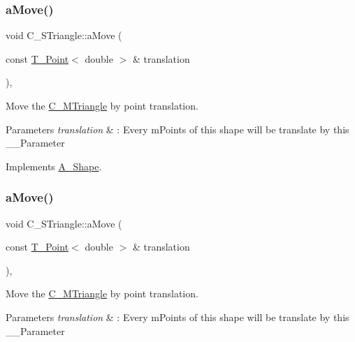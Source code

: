 \subsubsection{\texorpdfstring{a\+Move()}{aMove()}\hspace{0.1cm}{\footnotesize\ttfamily [1/2]}}
{\footnotesize\ttfamily void C\+\_\+\+S\+Triangle\+::a\+Move (\begin{DoxyParamCaption}\item[{const \hyperlink{classT__Point}{T\+\_\+\+Point}$<$ double $>$ \&}]{translation }\end{DoxyParamCaption})\hspace{0.3cm}{\ttfamily [override]}, {\ttfamily [virtual]}}



Move the \hyperlink{classC__MTriangle}{C\+\_\+\+M\+Triangle} by point translation. 


\begin{DoxyParams}{Parameters}
{\em translation} & \+: Every m\+Points of this shape will be translate by this \+\_\+\+\_\+\+Parameter \\
\hline
\end{DoxyParams}


Implements \hyperlink{classA__Shape_ab284298db1b557ccfa7ba6de7a5fee2c}{A\+\_\+\+Shape}.

\mbox{\label{classC__STriangle_a82a3c3a847ca6c2d5922921150fa50b5}} 
\subsubsection{\texorpdfstring{a\+Move()}{aMove()}\hspace{0.1cm}{\footnotesize\ttfamily [2/2]}}
{\footnotesize\ttfamily void C\+\_\+\+S\+Triangle\+::a\+Move (\begin{DoxyParamCaption}\item[{const \hyperlink{classT__Point}{T\+\_\+\+Point}$<$ double $>$ \&}]{translation }\end{DoxyParamCaption})\hspace{0.3cm}{\ttfamily [override]}, {\ttfamily [virtual]}}



Move the \hyperlink{classC__MTriangle}{C\+\_\+\+M\+Triangle} by point translation. 


\begin{DoxyParams}{Parameters}
{\em translation} & \+: Every m\+Points of this shape will be translate by this \+\_\+\+\_\+\+Parameter \\
\hline
\end{DoxyParams}


